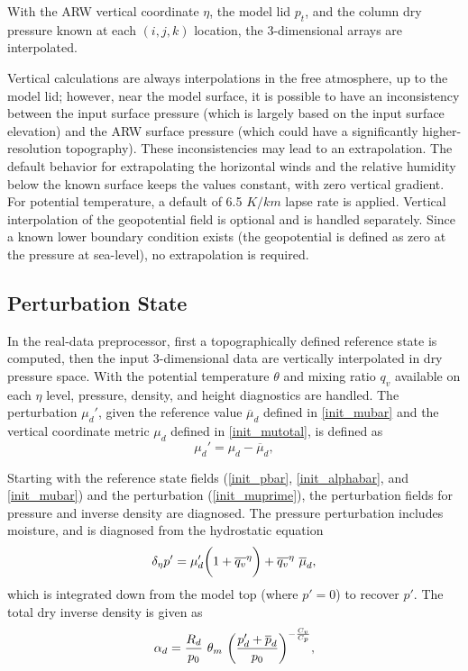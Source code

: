 \noindent
With the ARW vertical coordinate $\eta$, the model lid $p_{t}$, and the column dry
pressure known at each $(i,j,k)$ location, the 3-dimensional arrays are interpolated.

Vertical calculations are always interpolations in the free atmosphere, up to the model lid;
however, near the model surface, it is possible to have an inconsistency between the input
surface pressure (which is largely based on the input surface elevation) and the ARW surface
pressure (which could have a significantly higher-resolution topography).  These inconsistencies
may lead to an extrapolation.  The default behavior for extrapolating the horizontal winds and
the relative humidity below the known surface keeps the values constant, with zero vertical gradient.
For potential temperature, a default of 6.5 $K/km$ lapse rate is applied.
Vertical interpolation of the geopotential field is optional and is
handled separately.  Since a known lower boundary condition exists  
(the geopotential is defined as zero at the pressure at sea-level), no extrapolation is required.



\subsection{Perturbation State}

In the real-data preprocessor, first a topographically defined reference state is computed, 
then the input 3-dimensional data are vertically
interpolated in dry pressure space. With the potential temperature $\theta$ and mixing ratio
$q_v$ available on each $\eta$ level, pressure, density, and height diagnostics are
handled.
\noindent  The perturbation $\mu_d'$,
given the reference value $\overline{\mu}_d$ defined in \eqref{init_mubar} 
and the vertical coordinate metric $\mu_d$ defined in \eqref{init_mutotal},
is defined as
\begin{equation}
\mu_d'  = \mu_d - \overline{\mu}_d,
\label{init_muprime}
\end{equation}

\noindent Starting with the reference state fields 
(\ref{init_pbar}, \ref{init_alphabar}, and \ref{init_mubar}) and the perturbation (\ref{init_muprime}),
the perturbation fields for pressure and inverse density are diagnosed.
The pressure perturbation includes moisture, and is diagnosed from 
the hydrostatic equation
%
\begin{equation}
\delta_{\eta} p' = \mu'_d \bigg(1 + {\overline{q_v}^\eta} \bigg) + 
                     \overline{q_v}^\eta~\overline \mu_d,
\notag
\end{equation}
%
\noindent 
which is
integrated down from 
the model top (where $p'= 0$) to recover $p'$.
The total dry inverse density is given as
\begin{equation}
\alpha_d = {R_d \over p_{0} } ~ \theta_m~ 
                                        \bigg( {{p'_d + \overline {p}_d} \over p_{0} } \bigg )^{-{C_v \over C_p}},
\notag
\end{equation}


